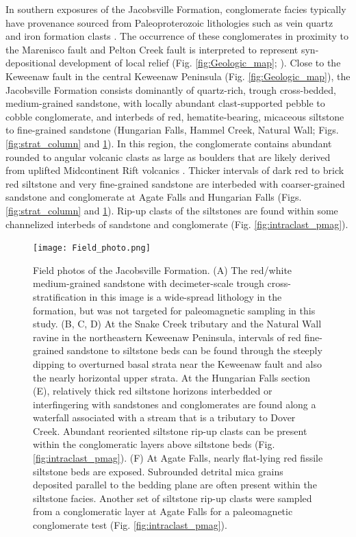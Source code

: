 \documentclass[draft]{agujournal2019}
\begin{document}
In southern exposures of the Jacobsville Formation, conglomerate facies typically have provenance sourced from Paleoproterozoic lithologies such as vein quartz and iron formation clasts \cite{Hamblin1958a, Kalliokoski1982a}. The occurrence of these conglomerates in proximity to the Marenisco fault and Pelton Creek fault is interpreted to represent syn-depositional development of local relief (Fig. \ref{fig:Geologic_map}; ). Close to the Keweenaw fault in the central Keweenaw Peninsula (Fig. \ref{fig:Geologic_map}), the Jacobsville Formation consists dominantly of quartz-rich, trough cross-bedded, medium-grained sandstone, with locally abundant clast-supported pebble to cobble conglomerate, and interbeds of red, hematite-bearing, micaceous siltstone to fine-grained sandstone (Hungarian Falls, Hammel Creek, Natural Wall; Figs. \ref{fig:strat_column} and \ref{fig:Field_photo}). In this region, the conglomerate contains abundant rounded to angular volcanic clasts as large as boulders that are likely derived from uplifted Midcontinent Rift volcanics \cite{Irving1885a, Brojanigo1984a}. Thicker intervals of dark red to brick red siltstone and very fine-grained sandstone are interbeded with coarser-grained sandstone and conglomerate at Agate Falls and Hungarian Falls (Figs. \ref{fig:strat_column} and \ref{fig:Field_photo}). Rip-up clasts of the siltstones are found within some channelized interbeds of sandstone and conglomerate (Fig. \ref{fig:intraclast_pmag}). 

\begin{figure}[h!]
\centering
\texttt{[image: Field\_photo.png]}
\caption{\scriptsize Field photos of the Jacobsville Formation. (A) The red/white medium-grained sandstone with decimeter-scale trough cross-stratification in this image is a wide-spread lithology in the formation, but was not targeted for paleomagnetic sampling in this study. (B, C, D) At the Snake Creek tributary and the Natural Wall ravine in the northeastern Keweenaw Peninsula, intervals of red fine-grained sandstone to siltstone beds can be found through the steeply dipping to overturned basal strata near the Keweenaw fault and also the nearly horizontal upper strata. At the Hungarian Falls section (E), relatively thick red siltstone horizons interbedded or interfingering with sandstones and conglomerates are found along a waterfall associated with a stream that is a tributary to Dover Creek. Abundant reoriented siltstone rip-up clasts can be present within the conglomeratic layers above siltstone beds (Fig. \ref{fig:intraclast_pmag}). (F) At Agate Falls, nearly flat-lying red fissile siltstone beds are exposed. Subrounded detrital mica grains deposited parallel to the bedding plane are often present within the siltstone facies. Another set of siltstone rip-up clasts were sampled from a conglomeratic layer at Agate Falls for a paleomagnetic conglomerate test (Fig. \ref{fig:intraclast_pmag}).}
\label{fig:Field_photo}
\end{figure}
\end{document}
